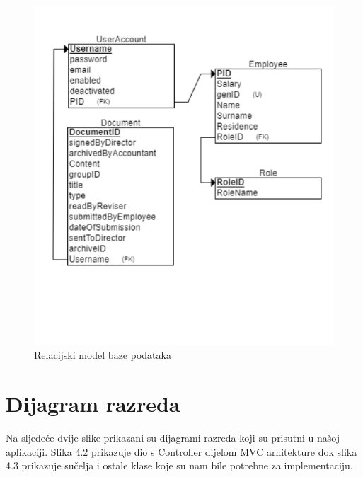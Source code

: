 			\begin{figure}[H]
				\includegraphics[scale=0.58]{slike/RELschema.png} %
				\centering
				\caption{Relacijski model baze podataka}
				\label{REL}
			\end{figure}
			
			
			
			
			
			\newpage
			\section{Dijagram razreda}
			Na sljedeće dvije slike prikazani su dijagrami razreda koji su prisutni u našoj aplikaciji. Slika 4.2 prikazuje dio s Controller dijelom MVC arhitekture dok slika 4.3 prikazuje sučelja i ostale klase koje su nam bile potrebne za implementaciju. 
			
